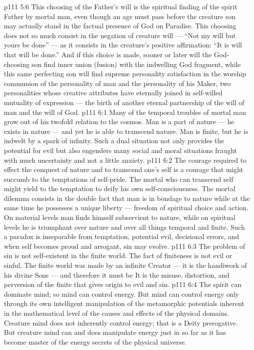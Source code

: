 \vs p111 5:6 This choosing of the Father’s will is the spiritual finding of the spirit Father by mortal man, even though an age must pass before the creature son may actually stand in the factual presence of God on Paradise. This choosing does not so much consist in the negation of creature will --- “Not my will but yours be done” --- as it consists in the creature’s positive affirmation: “It is  will that  will be done.” And if this choice is made, sooner or later will the God\hyp{}choosing son find inner union (fusion) with the indwelling God fragment, while this same perfecting son will find supreme personality satisfaction in the worship communion of the personality of man and the personality of his Maker, two personalities whose creative attributes have eternally joined in self\hyp{}willed mutuality of expression --- the birth of another eternal partnership of the will of man and the will of God.
\vs p111 6:1 Many of the temporal troubles of mortal man grow out of his twofold relation to the cosmos. Man is a part of nature --- he exists in nature --- and yet he is able to transcend nature. Man is finite, but he is indwelt by a spark of infinity. Such a dual situation not only provides the potential for evil but also engenders many social and moral situations fraught with much uncertainty and not a little anxiety.
\vs p111 6:2 The courage required to effect the conquest of nature and to transcend one’s self is a courage that might succumb to the temptations of self\hyp{}pride. The mortal who can transcend self might yield to the temptation to deify his own self\hyp{}consciousness. The mortal dilemma consists in the double fact that man is in bondage to nature while at the same time he possesses a unique liberty --- freedom of spiritual choice and action. On material levels man finds himself subservient to nature, while on spiritual levels he is triumphant over nature and over all things temporal and finite. Such a paradox is inseparable from temptation, potential evil, decisional errors, and when self becomes proud and arrogant, sin may evolve.
\vs p111 6:3 \pc The problem of sin is not self\hyp{}existent in the finite world. The fact of finiteness is not evil or sinful. The finite world was made by an infinite Creator --- it is the handiwork of his divine Sons --- and therefore it must be  It is the misuse, distortion, and perversion of the finite that gives origin to evil and sin.
\vs p111 6:4 \pc The spirit can dominate mind; so mind can control energy. But mind can control energy only through its own intelligent manipulation of the metamorphic potentials inherent in the mathematical level of the causes and effects of the physical domains. Creature mind does not inherently control energy; that is a Deity prerogative. But creature mind can and does manipulate energy just in so far as it has become master of the energy secrets of the physical universe.
